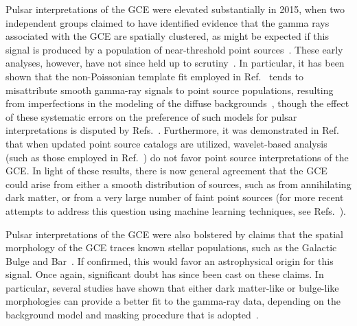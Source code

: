 Pulsar interpretations of the GCE were elevated substantially in 2015, when two independent groups claimed to have identified evidence that the gamma rays associated with the GCE are spatially clustered, as might be expected if this signal is produced by a population of near-threshold point sources~\cite{Lee:2015fea,Bartels:2015aea}. These early analyses, however, have not since held up to scrutiny~\cite{Leane:2019xiy,Leane:2020nmi,Leane:2020pfc,Zhong:2019ycb}. In particular, it has been shown that the non-Poissonian template fit employed in Ref.~\cite{Lee:2015fea} tends to misattribute smooth gamma-ray signals to point source populations, resulting from imperfections in the modeling of the diffuse backgrounds~\cite{Leane:2019xiy,Leane:2020nmi,Leane:2020pfc}, though the effect of these systematic errors on the preference of such models for pulsar interpretations is disputed by Refs.~\cite{Chang:2019ars, Buschmann:2020adf}.  Furthermore, it was demonstrated in Ref.~\cite{Zhong:2019ycb} that when updated point source catalogs are utilized, wavelet-based analysis (such as those employed in Ref.~\cite{Bartels:2015aea}) do
not favor point source interpretations of the GCE. In light of these results, there is now general agreement that the GCE could arise from either a smooth distribution of sources, such as from annihilating dark matter, or from a very large number of faint point sources (for more recent attempts to address this question using machine learning techniques, see Refs.~\cite{List:2021aer,Mishra-Sharma:2021oxe,List:2020mzd,Caron:2017udl, Caron:2022akb, Ramirez:2024oiw}). 

Pulsar interpretations of the GCE were also bolstered by claims that the spatial morphology of the GCE traces known stellar populations, such as the Galactic Bulge and Bar~\cite{Macias:2019omb,Macias:2016nev,Bartels:2017vsx,Ramirez:2024oiw,Song:2024iup}. If confirmed, this would favor an astrophysical origin for this signal. Once again, significant doubt has since been cast on these claims. In particular, several studies have shown that either dark matter-like or bulge-like morphologies can provide a better fit to the gamma-ray data, depending on the background model and masking procedure that is adopted~\cite{Zhong:2024vyi,McDermott:2022zmq,Cholis:2021rpp,DiMauro:2021raz, Song:2024iup}. 


